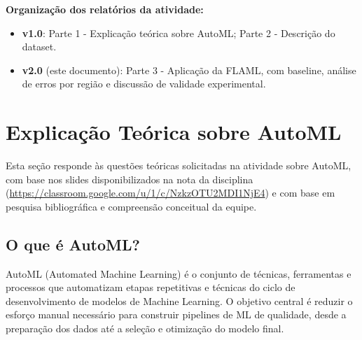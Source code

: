 \documentclass[11pt, a4paper, oneside]{article}
\begin{document}
\vspace{6mm}

\begin{infobox}
\textbf{Organização dos relatórios da atividade:}
\begin{itemize}[leftmargin=1.2cm, topsep=2pt, itemsep=2pt]
  \item \textbf{v1.0}: Parte 1 - Explicação teórica sobre AutoML; Parte 2 - Descrição do dataset.
  \item \textbf{v2.0} (este documento): Parte 3 - Aplicação da FLAML, com baseline, análise de erros por região e discussão de validade experimental.
\end{itemize}
\end{infobox}

\newpage

\tableofcontents
\newpage

\section{Explicação Teórica sobre AutoML}
\label{sec:automl-teoria}

\begin{infobox}
Esta seção responde às questões teóricas solicitadas na atividade sobre AutoML, com
base nos slides disponibilizados na nota da disciplina
(\url{https://classroom.google.com/u/1/c/NzkzOTU2MDI1NjE4}) e com base em
pesquisa bibliográfica e compreensão conceitual da equipe.
\end{infobox}

\subsection{O que é AutoML?}
\label{sec:o-que-e-automl}

AutoML (Automated Machine Learning) é o conjunto de técnicas, ferramentas e processos
que automatizam etapas repetitivas e técnicas do ciclo de desenvolvimento de modelos
de Machine Learning. O objetivo central é reduzir o esforço manual necessário para
construir pipelines de ML de qualidade, desde a preparação dos dados até a seleção e
otimização do modelo final.
\end{document}
